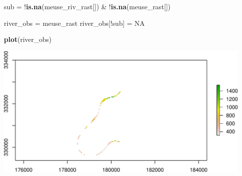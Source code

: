 \documentclass[11pt,ignorenonframetext,]{beamer}
\newenvironment{Shaded}{}{}
\newcommand{\KeywordTok}[1]{\textcolor[rgb]{0.00,0.44,0.13}{\textbf{#1}}}
\newcommand{\StringTok}[1]{\textcolor[rgb]{0.25,0.44,0.63}{#1}}
\newcommand{\OtherTok}[1]{\textcolor[rgb]{0.00,0.44,0.13}{#1}}
\newcommand{\OperatorTok}[1]{\textcolor[rgb]{0.40,0.40,0.40}{#1}}
\newcommand{\NormalTok}[1]{#1}
\let\oldShaded\Shaded
\let\endoldShaded\endShaded
\renewenvironment{Shaded}{\footnotesize\begin{spacing}{0.9}\oldShaded}{\endoldShaded\end{spacing}}
\let\oldverbatim\verbatim
\let\endoldverbatim\endverbatim
\newcommand{\scriptoutput}{
  \renewenvironment{Shaded}{\scriptsize\begin{spacing}{0.9}\oldShaded}{\endoldShaded\end{spacing}}
  \renewenvironment{verbatim}{\scriptsize\begin{spacing}{0.9}\oldverbatim}{\endoldverbatim\end{spacing}}
}
\begin{document}
\begin{frame}[fragile,t]{}

\scriptoutput

\begin{Shaded}
\begin{Highlighting}[]
\NormalTok{sub =}\StringTok{ }\OperatorTok{!}\KeywordTok{is.na}\NormalTok{(meuse_riv_rast[]) }\OperatorTok{&}\StringTok{ }\OperatorTok{!}\KeywordTok{is.na}\NormalTok{(meuse_rast[])}

\NormalTok{river_obs =}\StringTok{ }\NormalTok{meuse_rast}
\NormalTok{river_obs[}\OperatorTok{!}\NormalTok{sub] =}\StringTok{ }\OtherTok{NA}

\KeywordTok{plot}\NormalTok{(river_obs)}
\end{Highlighting}
\end{Shaded}

\begin{center}\includegraphics[width=0.95\textwidth]{Lec17_files/figure-beamer/unnamed-chunk-38-1} \end{center}

\begin{Shaded}
\begin{Highlighting}[]


\end{Highlighting}
\end{Shaded}
\end{frame}
\end{document}

